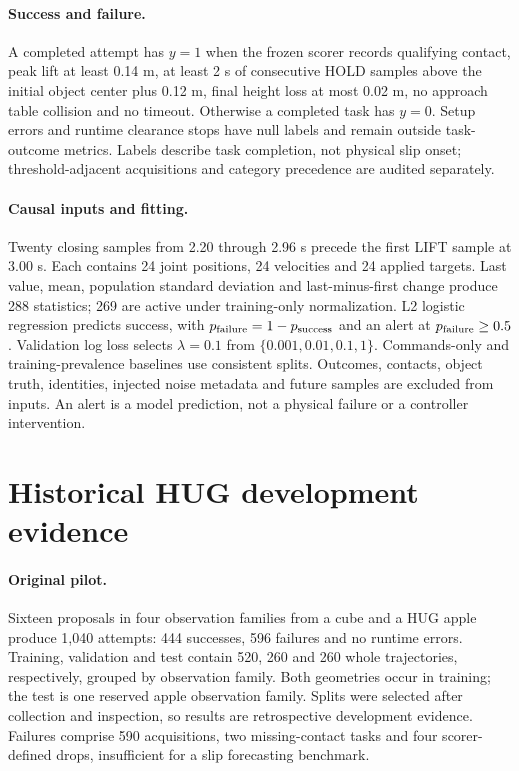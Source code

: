 \documentclass[10pt,letterpaper]{article}
\begin{document}
\paragraph{Success and failure.}
A completed attempt has $y=1$ when the frozen scorer records qualifying contact,
peak lift at least 0.14 m, at least 2 s of consecutive HOLD samples above the
initial object center plus 0.12 m, final height loss at most 0.02 m, no approach
table collision and no timeout. Otherwise a completed task has $y=0$.
Setup errors and runtime clearance stops have null labels and remain outside
task-outcome metrics. Labels describe task completion, not physical slip onset;
threshold-adjacent acquisitions and category precedence are audited separately.

\paragraph{Causal inputs and fitting.}
Twenty closing samples from 2.20 through 2.96 s precede the first LIFT sample
at 3.00 s. Each contains 24 joint positions, 24 velocities and 24 applied targets.
Last value, mean, population standard deviation and last-minus-first change
produce 288 statistics; 269 are active under training-only normalization.
L2 logistic regression predicts success, with
$p_{\rm failure}=1-p_{\rm success}$ and an alert at $p_{\rm failure}\geq0.5$.
Validation log loss selects $\lambda=0.1$ from
$\{0.001,0.01,0.1,1\}$. Commands-only and training-prevalence baselines use
consistent splits. Outcomes, contacts, object truth, identities, injected noise
metadata and future samples are excluded from inputs. An alert is a model
prediction, not a physical failure or a controller intervention.

\section{Historical HUG development evidence}
\paragraph{Original pilot.}
Sixteen proposals in four observation families from a cube and a HUG apple
produce 1,040 attempts: 444 successes, 596 failures and no runtime errors.
Training, validation and test contain 520, 260 and 260 whole trajectories,
respectively, grouped by observation family. Both geometries occur in training;
the test is one reserved apple observation family. Splits were selected after
collection and inspection, so results are retrospective development evidence.
Failures comprise 590 acquisitions, two missing-contact tasks and four
scorer-defined drops, insufficient for a slip forecasting benchmark.
\end{document}
